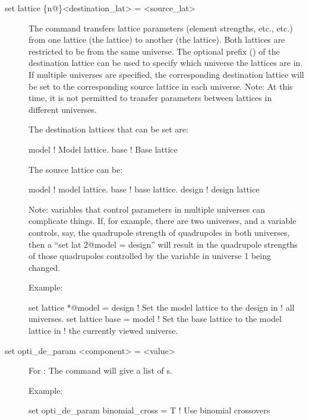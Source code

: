 {{\begin{description}
\item[set lattice \{n@\}<destination\_lat> = <source\_lat>] \Newline
The  command transfers lattice parameters (element
strengths, etc., etc.) from one lattice (the  lattice) to
another (the  lattice). Both lattices are restricted
to be from the same universe. The optional  prefix
() of the destination lattice can be used to specify
which universe the lattices are in. If multiple universes are
specified, the corresponding destination lattice will be set to the
corresponding source lattice in each universe. Note: At this time, it
is not permitted to transfer parameters between lattices in different
universes.

The destination lattices that can be set are:
\begin{example}
  model      ! Model lattice.
  base       ! Base lattice
\end{example}
The source lattice can be:
\begin{example}
  model       ! model lattice.
  base        ! base lattice.
  design      ! design lattice
\end{example}

Note: \tao variables that control parameters in multiple universes can
complicate things. If, for example, there are two universes, and a
\tao variable controls, say, the quadrupole strength of quadrupoles in
both universes, then a ``set lat 2@model = design'' will result in the
quadrupole strengths of those quadrupoles controlled by the variable
in universe 1 being changed.

Example:
\begin{example}
  set lattice *@model = design  ! Set the model lattice to the design in 
                                !   all universes.
  set lattice base = model      ! Set the base lattice to the model lattice in 
                                !   the currently viewed universe.
\end{example}


\item[set opti_de_param <component> = <value>] \Newline
For : The  command will give a list of 
s.

Example:
\begin{example}
  set opti_de_param binomial_cross = T  ! Use binomial crossovers 
\end{example}


\end{description}}}
